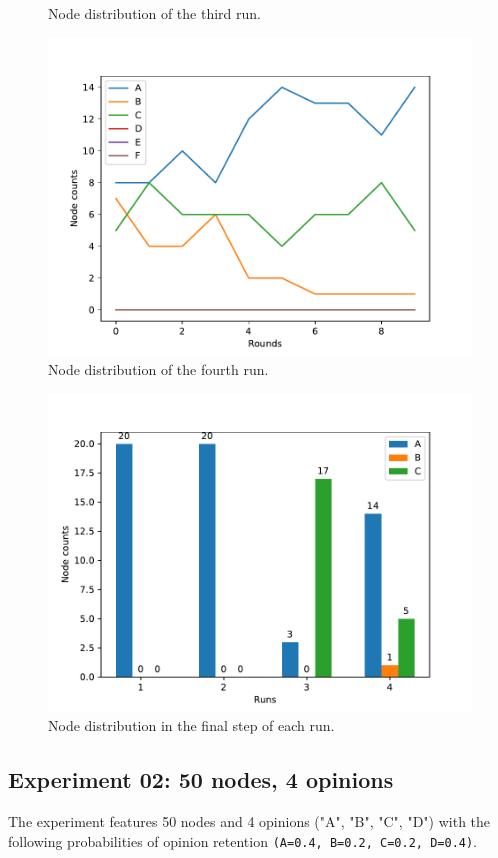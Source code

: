 \documentclass[11pt]{article}
\begin{document}
\begin{figure}[ht]
\begin{minipage}[b]{0.5\linewidth}
	\caption{Node distribution of the third run.}
  \end{minipage}%
  \begin{minipage}[b]{0.5\linewidth}
    \centering
    \includegraphics[width=0.9\linewidth]{results/01/run-4/distribution} 
	\caption{Node distribution of the fourth run.}
  \end{minipage} 
\end{figure}

\begin{figure}[h]
	\centering
	\includegraphics[width=0.5\linewidth]{results/01/distribution} 
	\caption{Node distribution in the final step of each run.}
\end{figure}

\pagebreak

\subsection*{Experiment 02: 50 nodes, 4 opinions}

The experiment features 50 nodes and 4 opinions ("A", "B", "C", "D") with the following probabilities of opinion retention \verb|(A=0.4, B=0.2, C=0.2, D=0.4)|.
\end{document}
